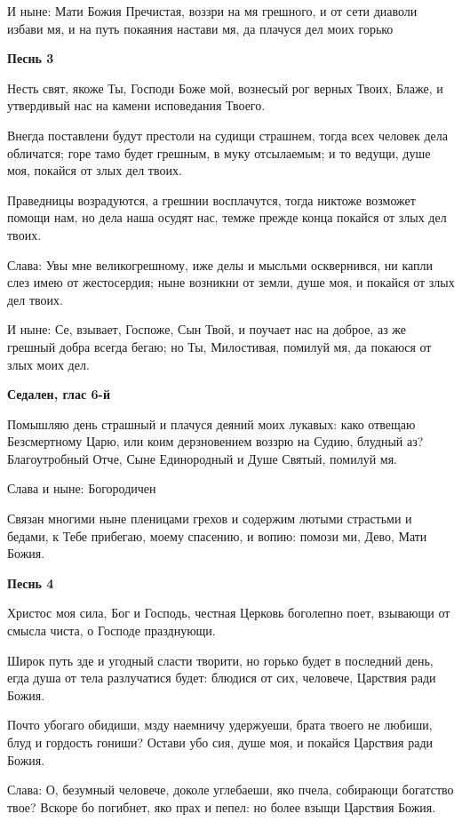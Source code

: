 И ныне: Мати Божия Пречистая, воззри на мя грешного, и от сети диаволи избави мя, и на путь покаяния настави мя, да плачуся дел моих горько


\medskip
\bfseries Песнь 3\normalfont{}


Несть свят, якоже Ты, Господи Боже мой, вознесый рог верных Твоих, Блаже, и утвердивый нас на камени исповедания Твоего.


Внегда поставлени будут престоли на судищи страшнем, тогда всех человек дела обличатся; горе тамо будет грешным, в муку отсылаемым; и то ведущи, душе моя, покайся от злых дел твоих.

Праведницы возрадуются, а грешнии восплачутся, тогда никтоже возможет помощи нам, но дела наша осудят нас, темже прежде конца покайся от злых дел твоих.


Слава: Увы мне великогрешному, иже делы и мысльми осквернився, ни капли слез имею от жестосердия; ныне возникни от земли, душе моя, и покайся от злых дел твоих.


И ныне: Се, взывает, Госпоже, Сын Твой, и поучает нас на доброе, аз же грешный добра всегда бегаю; но Ты, Милостивая, помилуй мя, да покаюся от злых моих дел.


\medskip
\bfseries Седален, глас 6-й\normalfont{}


Помышляю день страшный и плачуся деяний моих лукавых: како отвещаю Безсмертному Царю, или коим дерзновением воззрю на Судию, блудный аз? Благоутробный Отче, Сыне Единородный и Душе Святый, помилуй мя.


Слава и ныне: Богородичен


Связан многими ныне пленицами грехов и содержим лютыми страстьми и бедами, к Тебе прибегаю, моему спасению, и вопию: помози ми, Дево, Мати Божия.


\medskip
\bfseries Песнь 4\normalfont{}


Христос моя сила, Бог и Господь, честная Церковь боголепно поет, взывающи от смысла чиста, о Господе празднующи.


Широк путь зде и угодный сласти творити, но горько будет в последний день, егда душа от тела разлучатися будет: блюдися от сих, человече, Царствия ради Божия.


Почто убогаго обидиши, мзду наемничу удержуеши, брата твоего не любиши, блуд и гордость гониши? Остави убо сия, душе моя, и покайся Царствия ради Божия.


Слава: О, безумный человече, доколе углебаеши, яко пчела, собирающи богатство твое? Вскоре бо погибнет, яко прах и пепел: но более взыщи Царствия Божия.



